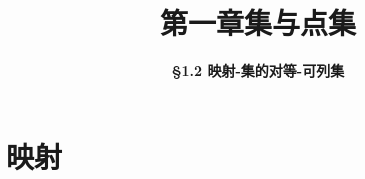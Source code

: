 \everymath{\displaystyle}



\title[第一章\\
集与点集]{\texorpdfstring{\LARGE \bfseries 第一章\quad 集与点集}{第一章 集与点集}} %
\author[\S 1.2\\
映射-集的对等] %
{\Large \bfseries \S 1.2 映射-集的对等-可列集}
\date{}





\begin{frame}

\titlepage %

\end{frame}




\section{映射}

